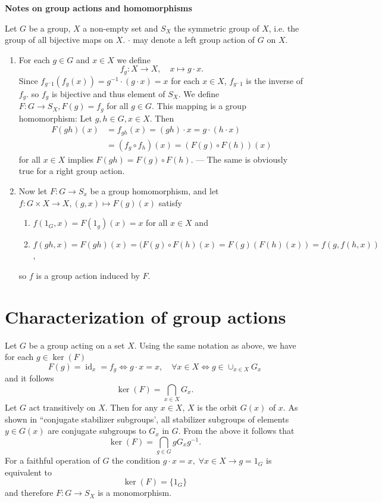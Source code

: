 \documentclass[12pt]{article}
\begin{document}
\textbf{Notes on group actions and homomorphisms}

Let $G$ be a group, $X$ a non-empty set and $S_X$ the symmetric group 
of $X$,
i.e. the group of all bijective maps on $X$. $\cdot$ may denote a left 
group
action of $G$ on $X$.
\begin{enumerate}
\item
For each $g \in G$ and $x \in X$ we define
\begin{displaymath}
f_g\colon X \to X, \quad x \mapsto g\cdot x \mbox{.}
\end{displaymath}
Since $f_{g^-1}(f_g(x)) =g^{-1} \cdot (g \cdot x) =x$ for each
$x \in X$,
$f_{g^-1}$ is the inverse of $f_g$. so $f_g$ is bijective and thus element of
$S_X$. We define $F: G \to S_X, F(g) =f_g$ for all $g \in G$. This
mapping is a group homomorphism: Let $g,h \in G, x \in X$. Then
\begin{align*}
F(gh)(x) &=f_{gh}(x) =(gh) \cdot x =g \cdot (h \cdot x) \\
&=(f_g \circ f_h)(x)
=(F(g) \circ F(h))(x)
\end{align*}
for all $x\in X$ implies $F(gh) =F(g) \circ F(h)$. --- The same is obviously true for a right
group action.
\item
Now let $F: G \to S_x$ be a group homomorphism, and let 
$f: G \times X \to X, (g,x) \mapsto F(g)(x)$ satisfy
\begin{enumerate}
\item
$f(1_G, x) =F(1_g)(x) =x$ for all $x \in X$ and
\item
$f(gh, x) =F(gh)(x) =(F(g) \circ F(h)(x) =F(g)(F(h)(x)) =f(g, f(h,x))$,
\end{enumerate}
so $f$ is a group action induced by $F$.
\end{enumerate}

\section*{Characterization of group actions}
Let $G$ be a group acting on a set $X$.
Using the same notation as above, we have for each 
$g \in \operatorname{ker}(F)$
\begin{equation}
F(g) =\operatorname{id}_x =f_g \Leftrightarrow g \cdot x =x, \quad \forall  x \in X \Leftrightarrow
g \in \cup_{x \in X} G_x
\end{equation}
and it follows
\begin{displaymath}
\operatorname{ker}(F) =\bigcap_{x \in X} G_x.
\end{displaymath}
Let $G$ act transitively on $X$. Then for any $x \in X$, $X$ is the 
orbit $G(x)$
of $x$. As shown in ``conjugate stabilizer subgroups', all stabilizer 
subgroups
of elements $y \in G(x)$ are conjugate subgroups to $G_x$ in $G$. From 
the above it follows that
\begin{displaymath}
\operatorname{ker}(F) =\bigcap_{g \in G} gG_xg^{-1}.
\end{displaymath}
For a faithful operation of $G$ the condition $g \cdot x =x, \;
\forall x \in X
\rightarrow g =1_G$ is equivalent to
\begin{displaymath}
\operatorname{ker}(F) =\{1_G\}
\end{displaymath}
and therefore $F\colon G \to S_X$ is a monomorphism.
\end{document}

